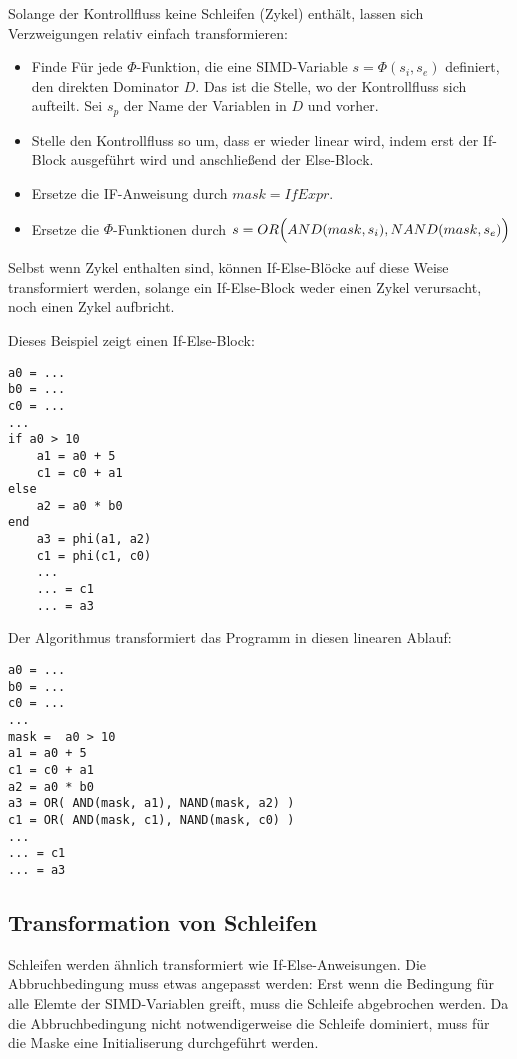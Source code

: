 \documentclass[a4paper,10pt]{article}
\begin{document}
Solange der Kontrollfluss keine Schleifen (Zykel) enthält, lassen sich Verzweigungen 
relativ einfach transformieren:

\begin{itemize}

    \item Finde Für jede $\Phi$-Funktion, die eine SIMD-Variable $s = \Phi(s_i, s_e)$ definiert, den
    direkten Dominator $D$.  Das ist die Stelle, wo der Kontrollfluss sich aufteilt. Sei $s_p$ der
    Name der Variablen in $D$ und vorher.

    \item Stelle den Kontrollfluss so um, dass er wieder linear wird, indem erst der If-Block ausgeführt wird
    und anschließend der Else-Block. 
    
    \item Ersetze die IF-Anweisung durch $mask = IfExpr$.

    \item Ersetze die $\Phi$-Funktionen durch $s = OR\Bigl( AND(mask, s_i), NAND(mask, s_e)\Bigr)$

\end{itemize}

Selbst wenn Zykel enthalten sind, können If-Else-Blöcke auf diese Weise transformiert werden,
solange ein If-Else-Block weder einen Zykel verursacht, noch einen Zykel aufbricht.

Dieses Beispiel zeigt einen If-Else-Block:

\begin{verbatim}
a0 = ...
b0 = ...
c0 = ...
...
if a0 > 10 
    a1 = a0 + 5
    c1 = c0 + a1
else
    a2 = a0 * b0
end
    a3 = phi(a1, a2)
    c1 = phi(c1, c0)
    ...
    ... = c1
    ... = a3
\end{verbatim}

Der Algorithmus transformiert das Programm in diesen linearen Ablauf:

\begin{verbatim}
a0 = ...
b0 = ...
c0 = ...
...
mask =  a0 > 10 
a1 = a0 + 5
c1 = c0 + a1
a2 = a0 * b0
a3 = OR( AND(mask, a1), NAND(mask, a2) )
c1 = OR( AND(mask, c1), NAND(mask, c0) )
...
... = c1
... = a3
\end{verbatim}

\subsection{Transformation von Schleifen}

Schleifen werden ähnlich transformiert wie If-Else-Anweisungen. Die Abbruchbedingung muss etwas
angepasst werden: Erst wenn die Bedingung für alle Elemte der SIMD-Variablen greift, muss die
Schleife abgebrochen werden. Da die Abbruchbedingung nicht notwendigerweise die Schleife dominiert,
muss für die Maske eine Initialiserung durchgeführt werden.
\end{document}
